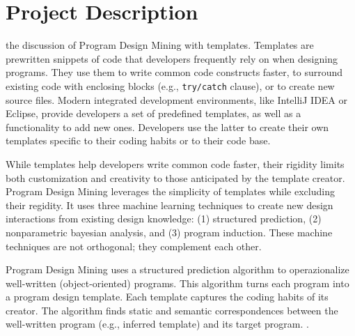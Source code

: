 \chapter{Project Description}{}
\label{sec:related}

 the discussion of Program Design Mining with templates. 
Templates are prewritten snippets of code that developers frequently rely on when 
designing programs. They use them to write common code constructs faster, to 
surround existing code with enclosing blocks (e.g., \texttt{try/catch} clause), or to 
create new source files. Modern integrated development environments, like IntelliJ IDEA 
or Eclipse, provide developers a set of predefined templates, as well as a functionality 
to add new ones. Developers use the latter to create their own templates specific to 
their coding habits or to their code base. 

While templates help developers write common code faster, their rigidity limits both 
customization and creativity to those anticipated by the template creator. Program 
Design Mining leverages the simplicity of templates while excluding their regidity. It 
uses three machine learning techniques to create new design interactions from existing 
design knowledge: (1) structured prediction, (2) nonparametric bayesian analysis, and 
(3) program induction. These machine techniques are not orthogonal; they complement 
each other. 

Program Design Mining uses a structured prediction algorithm to operazionalize 
well-written (object-oriented) programs. This algorithm turns each program into a 
program design template. Each template captures the coding habits of its creator. 
The algorithm finds static and semantic correspondences between the well-written 
program (e.g., inferred template) and its target program. .


%
%
%
%
%
%

